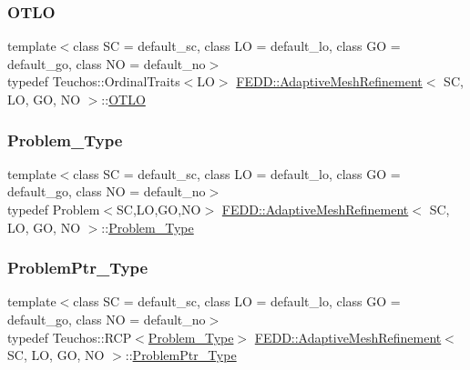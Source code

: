 \subsubsection{\texorpdfstring{O\+T\+LO}{OTLO}}
{\footnotesize\ttfamily template$<$class SC = default\+\_\+sc, class LO = default\+\_\+lo, class GO = default\+\_\+go, class NO = default\+\_\+no$>$ \\
typedef Teuchos\+::\+Ordinal\+Traits$<$LO$>$ \hyperlink{classFEDD_1_1AdaptiveMeshRefinement}{F\+E\+D\+D\+::\+Adaptive\+Mesh\+Refinement}$<$ SC, LO, GO, NO $>$\+::\hyperlink{classFEDD_1_1AdaptiveMeshRefinement_a5926fc86d008bfd69ae52e9190197eb0}{O\+T\+LO}}

\mbox{\label{classFEDD_1_1AdaptiveMeshRefinement_a88c7a8713a81d90ff9d82a08ba596cda}} 
\subsubsection{\texorpdfstring{Problem\+\_\+\+Type}{Problem\_Type}}
{\footnotesize\ttfamily template$<$class SC = default\+\_\+sc, class LO = default\+\_\+lo, class GO = default\+\_\+go, class NO = default\+\_\+no$>$ \\
typedef Problem$<$SC,LO,GO,NO$>$ \hyperlink{classFEDD_1_1AdaptiveMeshRefinement}{F\+E\+D\+D\+::\+Adaptive\+Mesh\+Refinement}$<$ SC, LO, GO, NO $>$\+::\hyperlink{classFEDD_1_1AdaptiveMeshRefinement_a88c7a8713a81d90ff9d82a08ba596cda}{Problem\+\_\+\+Type}}

\mbox{\label{classFEDD_1_1AdaptiveMeshRefinement_a442c6ca5dc4d866e3b1c6cdb613e2281}} 
\subsubsection{\texorpdfstring{Problem\+Ptr\+\_\+\+Type}{ProblemPtr\_Type}}
{\footnotesize\ttfamily template$<$class SC = default\+\_\+sc, class LO = default\+\_\+lo, class GO = default\+\_\+go, class NO = default\+\_\+no$>$ \\
typedef Teuchos\+::\+R\+CP$<$\hyperlink{classFEDD_1_1AdaptiveMeshRefinement_a88c7a8713a81d90ff9d82a08ba596cda}{Problem\+\_\+\+Type}$>$ \hyperlink{classFEDD_1_1AdaptiveMeshRefinement}{F\+E\+D\+D\+::\+Adaptive\+Mesh\+Refinement}$<$ SC, LO, GO, NO $>$\+::\hyperlink{classFEDD_1_1AdaptiveMeshRefinement_a442c6ca5dc4d866e3b1c6cdb613e2281}{Problem\+Ptr\+\_\+\+Type}}

